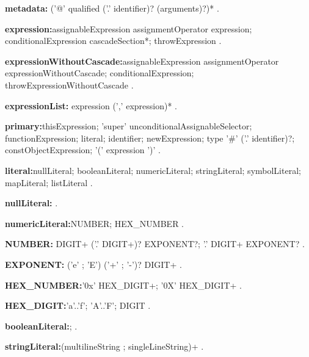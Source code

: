\begin{grammar}
{\bf metadata:}
      ('@' qualified ('.' identifier)? (arguments)?)*
    .
\end{grammar}
\begin{grammar}

{\bf expression:}assignableExpression assignmentOperator expression;
       conditionalExpression cascadeSection*;
       throwExpression     
    .
     
    
{\bf expressionWithoutCascade:}assignableExpression assignmentOperator expressionWithoutCascade;
      conditionalExpression;
      throwExpressionWithoutCascade    
    .

{\bf expressionList:}
      expression (',' expression)* %
    .
\end{grammar}
\begin{grammar}
{\bf primary:}thisExpression;
      'super' unconditionalAssignableSelector;
      functionExpression;
      literal;
      identifier;
      newExpression;
      \NEW{} type '\#' ('.' identifier)?;
      constObjectExpression;
      '(' expression ')'
    .
    
\end{grammar}
\begin{grammar}
{\bf literal:}nullLiteral;
      booleanLiteral;
      numericLiteral;
      stringLiteral;
      symbolLiteral;
      mapLiteral;
      listLiteral
    .
 \end{grammar}
\begin{grammar}
{\bf nullLiteral:}
      \NULL{}
.
\end{grammar}
\begin{grammar}
{\bf numericLiteral:}NUMBER;
      HEX_NUMBER
    .
    
  {\bf NUMBER:} DIGIT+ ('.' DIGIT+)? EXPONENT?;
      '.' DIGIT+ EXPONENT?
    .

{\bf  EXPONENT:}
      ('e' ; 'E') ('+' ; '-')? DIGIT+
    .

{\bf HEX_NUMBER:}'0x' HEX_DIGIT+;
      '0X' HEX_DIGIT+
    .

 {\bf HEX_DIGIT:}'a'..'f';
      'A'..'F';
      DIGIT
    .
 \end{grammar}
\begin{grammar}
{\bf booleanLiteral:}\TRUE{};
        \FALSE{}
    .
\end{grammar}
\begin{grammar}
{\bf stringLiteral:}(multilineString ; singleLineString)+
    .
\end{grammar}
